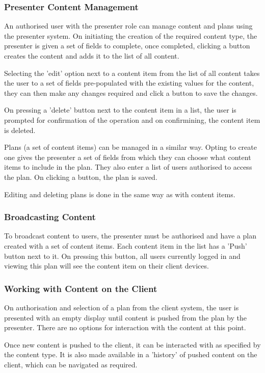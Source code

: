 \documentclass[a4papert,11pt,notitlepage]{ltxdoc}
\begin{document}
\subsubsection{Presenter Content Management}
An authorised user with the presenter role can manage content and plans using the presenter system. On initiating the creation of the required content type, the presenter is given a set of fields to complete, once completed, clicking a button creates the content and adds it to the list of all content.

Selecting the 'edit' option next to a content item from the list of all content takes the user to a set of fields pre-populated with the existing values for the content, they can then make any changes required and click a button to save the changes.

On pressing a 'delete' button next to the content item in a list, the user is prompted for confirmation of the operation and on confirmining, the content item is deleted.

Plans (a set of content items) can be managed in a similar way. Opting to create one gives the presenter a set of fields from which they can choose what content items to include in the plan. They also enter a list of users authorised to access the plan. On clicking a button, the plan is saved.

Editing and deleting plans is done in the same way as with content items.

\subsubsection{Broadcasting Content}
To broadcast content to users, the presenter must be authorised and have a plan created with a set of content items. Each content item in the list has a 'Push' button next to it. On pressing this button, all users currently logged in and viewing this plan will see the content item on their client devices.

\subsubsection{Working with Content on the Client}
On authorisation and selection of a plan from the client system, the user is presented with an empty display until content is pushed from the plan by the presenter. There are no options for interaction with the content at this point.

Once new content is pushed to the client, it can be interacted with as specified by the content type. It is also made available in a 'history' of pushed content on the client, which can be navigated as required.
\end{document}
